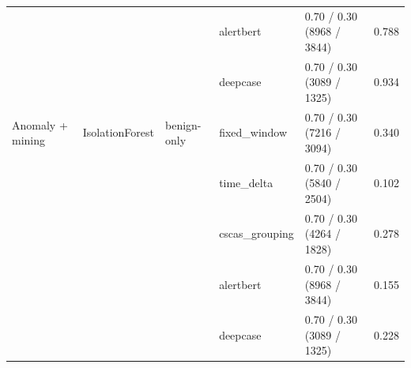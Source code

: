 \begin{table}[htbp]
{\begin{tabular}{lllllc}
 &  &  & alertbert & 0.70 / 0.30 (8968 / 3844) & 0.788 \\
 &  &  & deepcase & 0.70 / 0.30 (3089 / 1325) & 0.934 \\
\addlinespace
Anomaly + mining & IsolationForest & benign-only & fixed\_window & 0.70 / 0.30 (7216 / 3094) & 0.340 \\
 &  &  & time\_delta & 0.70 / 0.30 (5840 / 2504) & 0.102 \\
 &  &  & cscas\_grouping & 0.70 / 0.30 (4264 / 1828) & 0.278 \\
 &  &  & alertbert & 0.70 / 0.30 (8968 / 3844) & 0.155 \\
 &  &  & deepcase & 0.70 / 0.30 (3089 / 1325) & 0.228 \\
\bottomrule
\end{tabular}%
}
\end{table}

